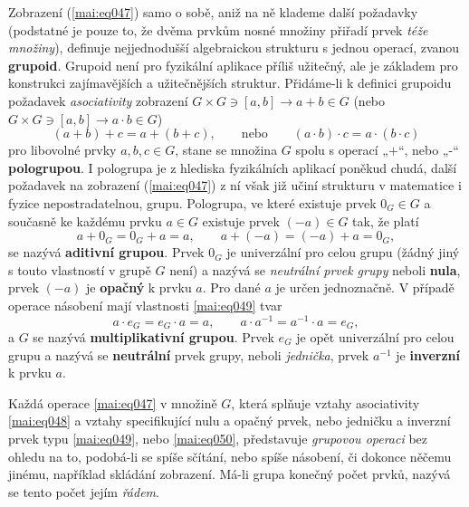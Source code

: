         Zobrazení (\ref{mai:eq047}) samo o sobě, aniž na ně klademe další požadavky (podstatné je 
        pouze to, že dvěma prvkům nosné množiny přiřadí prvek \emph{téže množiny}), definuje 
        nejjednodušší algebraickou strukturu s jednou operací, zvanou \textbf{grupoid}. Grupoid 
        není pro fyzikální aplikace příliš užitečný, ale je základem pro konstrukci zajímavějších a 
        užitečnějších struktur. Přidáme-li k definici grupoidu požadavek \emph{asociativity} 
        zobrazení \(G \times G \ni [a, b] \longrightarrow a + b \in G\) (nebo \(G \times G \ni [a, 
        b] \longrightarrow a \cdot b \in G\))
        \begin{equation}\label{mai:eq048}
          (a+b) + c = a + (b + c),\qquad \text{nebo}\qquad (a\cdot b) \cdot c = a \cdot (b \cdot c)
        \end{equation}
        pro libovolné prvky \(a, b, c \in G\), stane se množina \(G\) spolu s operací „\(+\)“, nebo 
        „-“ \textbf{pologrupou}. I pologrupa je z hlediska fyzikálních aplikací poněkud chudá, 
        další požadavek na zobrazení (\ref{mai:eq047}) z ní však již učiní strukturu v matematice i 
        fyzice nepostradatelnou, grupu. Pologrupa, ve které existuje prvek \(0_G\in G\) a současně 
        ke každému prvku \(a \in G\) existuje prvek \((-a) \in G\) tak, že platí
        \begin{equation}\label{mai:eq049}
          a + 0_G = 0_G + a = a,\qquad a + (-a) = (-a) + a = 0_G,
        \end{equation}
        se nazývá \textbf{aditivní grupou}. Prvek \(0_G\) je univerzální pro celou grupu (žádný 
        jiný s touto vlastností v grupě \(G\) není) a nazývá se \emph{neutrální prvek grupy} neboli 
        \textbf{nula}, prvek \((-a)\) je \textbf{opačný} k prvku \(a\). Pro dané \(a\) je určen 
        jednoznačně. V případě operace násobení mají vlastnosti \ref{mai:eq049} tvar
        \begin{equation}\label{mai:eq050}
          a \cdot e_G = e_G \cdot a = a,\qquad a \cdot a^{-1} = a^{-1} \cdot a = e_G,
        \end{equation}
        a \(G\) se nazývá \textbf{multiplikativní grupou}. Prvek \(e_G\) je opět univerzální pro 
        celou grupu a nazývá se \textbf{neutrální} prvek grupy, neboli \emph{jednička}, prvek 
        \(a^{-1}\) je \textbf{inverzní} k prvku \(a\).
        
        Každá operace \ref{mai:eq047} v množině \(G\), která splňuje vztahy asociativity 
        \ref{mai:eq048} a vztahy specifikující nulu a opačný prvek, nebo jedničku a inverzní prvek 
        typu \ref{mai:eq049}, nebo \ref{mai:eq050}, představuje \emph{grupovou operaci} bez ohledu 
        na to, podobá-li se spíše sčítání, nebo spíše násobení, či dokonce něčemu jinému, například 
        skládání zobrazení. Má-li grupa konečný počet prvků, nazývá se tento počet jejím 
        \emph{řádem}.

